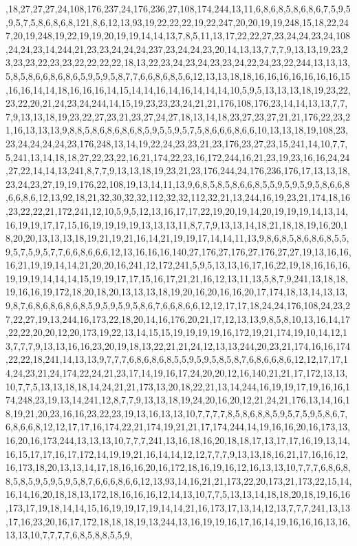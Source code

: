 ,18,27,27,27,24,108,176,237,24,176,236,27,108,174,244,13,11,6,8,6,8,5,8,6,8,6,7,5,9,5,9,5,7,5,8,6,8,6,8,121,8,6,12,13,93,19,22,22,22,19,22,247,20,20,19,19,248,15,18,22,247,20,19,248,19,22,19,19,20,19,19,14,14,13,7,8,5,11,13,17,22,22,27,23,24,24,23,24,108,24,24,23,14,244,21,23,23,24,24,24,237,23,24,24,23,20,14,13,13,7,7,7,9,13,13,19,23,23,23,23,22,23,23,22,22,22,22,18,13,22,23,24,23,24,23,23,24,22,24,23,22,244,13,13,13,5,8,5,8,6,6,8,6,8,6,5,9,5,9,5,8,7,7,6,6,8,6,8,5,6,12,13,13,18,18,16,16,16,16,16,16,16,15,16,16,14,14,18,16,16,16,14,15,14,14,16,14,16,14,14,14,10,5,9,5,13,13,13,18,19,23,22,23,22,20,21,24,23,24,244,14,15,19,23,23,23,24,21,21,176,108,176,23,14,14,13,13,7,7,7,9,13,13,18,19,23,22,27,23,21,23,27,24,27,18,13,14,18,23,27,23,27,21,21,176,22,23,21,16,13,13,13,9,8,8,5,8,6,8,6,8,6,8,5,9,5,5,9,5,7,5,8,6,6,6,8,6,6,10,13,13,18,19,108,23,23,24,24,24,24,23,176,248,13,14,19,22,24,23,23,21,23,176,23,27,23,15,241,14,10,7,7,5,241,13,14,18,18,27,22,23,22,16,21,174,22,23,16,172,244,16,21,23,19,23,16,16,24,24,27,22,14,14,13,241,8,7,7,9,13,13,18,19,23,21,23,176,244,24,176,236,176,17,13,13,18,23,24,23,27,19,19,176,22,108,19,13,14,11,13,9,6,8,5,8,5,8,6,6,8,5,5,9,5,9,5,9,5,8,6,6,8,6,6,8,6,12,13,92,18,21,32,30,32,32,112,32,32,112,32,21,13,244,16,19,23,21,174,18,16,23,22,22,21,172,241,12,10,5,9,5,12,13,16,17,17,22,19,20,19,14,20,19,19,19,14,13,14,16,19,19,17,17,15,16,19,19,19,19,13,13,13,11,8,7,7,9,13,13,14,18,21,18,18,19,16,20,18,20,20,13,13,13,18,19,21,19,21,16,14,21,19,19,17,14,14,11,13,9,8,6,8,5,8,6,8,6,8,5,5,9,5,7,5,9,5,7,7,6,6,8,6,6,6,12,13,16,16,16,140,27,176,27,176,27,176,27,27,19,13,16,16,16,21,19,19,14,14,21,20,20,16,241,12,172,241,5,9,5,13,13,16,17,16,22,19,18,16,16,16,19,19,19,14,14,14,15,19,19,17,17,15,16,17,21,21,16,12,13,11,13,5,8,7,9,241,13,18,18,19,16,16,19,172,18,20,18,20,13,13,13,18,19,20,16,20,16,16,20,17,174,18,13,14,13,13,9,8,7,6,8,6,8,6,8,6,8,5,9,5,9,5,9,5,8,6,7,6,6,8,6,6,12,12,17,17,18,24,24,176,108,24,23,27,22,27,19,13,244,16,173,22,18,20,14,16,176,20,21,17,12,13,13,9,8,5,8,10,13,16,14,17,22,22,20,20,12,20,173,19,22,13,14,15,15,19,19,19,19,16,172,19,21,174,19,10,14,12,13,7,7,7,9,13,13,16,16,23,20,19,18,13,22,21,21,24,12,13,13,244,20,23,21,174,16,16,174,22,22,18,241,14,13,13,9,7,7,7,6,8,6,8,6,8,5,5,9,5,9,5,8,5,8,7,6,8,6,6,8,6,12,12,17,17,14,24,23,21,24,174,22,24,21,23,17,14,19,16,17,24,20,20,12,16,140,21,21,17,172,13,13,10,7,7,5,13,13,18,18,14,24,21,21,173,13,20,18,22,21,13,14,244,16,19,19,17,19,16,16,174,248,23,19,13,14,241,12,8,7,7,9,13,13,18,19,24,20,16,20,12,21,24,21,176,13,14,16,18,19,21,20,23,16,16,23,22,23,19,13,16,13,13,10,7,7,7,7,8,5,8,6,8,8,5,9,5,7,5,9,5,8,6,7,6,8,6,6,8,12,12,17,17,16,174,22,21,174,19,21,21,17,174,244,14,19,16,16,20,16,173,13,16,20,16,173,244,13,13,13,10,7,7,7,241,13,16,18,16,20,18,18,17,13,17,17,16,19,13,14,16,15,17,17,16,17,172,14,19,19,21,16,14,14,12,12,7,7,7,9,13,13,18,16,21,17,16,16,12,16,173,18,20,13,13,14,17,18,16,16,20,16,172,18,16,19,16,12,16,13,13,10,7,7,7,6,8,6,8,8,5,8,5,9,5,9,5,9,5,8,7,6,6,6,8,6,6,12,13,93,14,16,21,21,173,22,20,173,21,173,22,15,14,16,14,16,20,18,18,13,172,18,16,16,16,12,14,13,10,7,7,5,13,13,14,18,18,20,18,19,16,16,173,17,19,18,14,14,15,16,19,19,17,19,14,14,21,16,173,17,13,14,12,13,7,7,7,241,13,13,17,16,23,20,16,17,172,18,18,18,19,13,244,13,16,19,19,16,17,16,14,19,16,16,16,13,16,13,13,10,7,7,7,7,6,8,5,8,8,5,5,9,